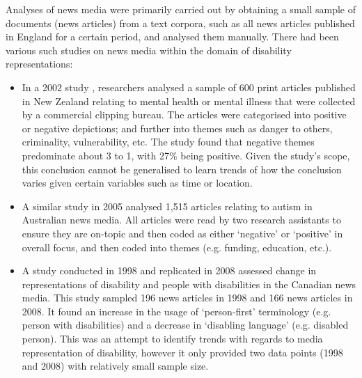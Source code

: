 \documentclass{report}
\begin{document}
Analyses of news media were primarily carried out by obtaining a small sample of documents (news articles) from a text corpora, such as all news articles published in England for a certain period, and analysed them manually. There had been various such studies on news media within the domain of disability representations:
\begin{itemize}
	\item In a 2002 study \cite{coverdale2002depictions}, researchers analysed a sample of 600 print articles published in New Zealand relating to mental health or mental illness that were collected by a commercial clipping bureau.
		The articles were categorised into positive or negative depictions; and further into themes such as danger to others, criminality, vulnerability, etc.
		The study found that negative themes predominate about 3 to 1, with 27\% being positive.
		Given the study's scope, this conclusion cannot be generalised to learn trends of how the conclusion varies given certain variables such as time or location.
	\item A similar study in 2005 \cite{jones2009representations} analysed 1,515 articles relating to autism in Australian news media.
		All articles were read by two research assistants to ensure they are on-topic and then coded as either `negative' or `positive' in overall focus, and then coded into themes (e.g. funding, education, etc.).
	\item A study conducted in 1998 \cite{gold1999media} and replicated in 2008 \cite{devotta2013representations} assessed change in representations of disability and people with disabilities in the Canadian news media.
		This study sampled 196 news articles in 1998 and 166 news articles in 2008.
		It found an increase in the usage of `person-first' terminology (e.g. person with disabilities) and a decrease in `disabling language' (e.g. disabled person). %
		This was an attempt to identify trends with regards to media representation of disability, however it only provided two data points (1998 and 2008) with relatively small sample size.
\end{itemize}
\end{document}
